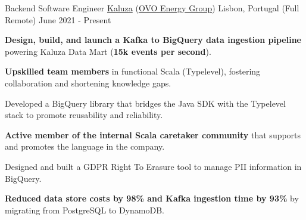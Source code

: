 
\begin{cventries}
  \vspace{-2mm}
  \cventry
    {Backend Software Engineer}
    {\href{https://www.kaluza.com/}{Kaluza} (\href{https://www.ovoenergy.com/}{OVO Energy Group})}
    {Lisbon, Portugal (Full Remote)}
    {June 2021 - Present}
    {
      \begin{cvitems}
        \item \textbf{Design, build, and launch a Kafka to BigQuery data ingestion pipeline} powering Kaluza Data Mart (\textbf{15k events per second}).
        \item \textbf{Upskilled team members} in functional Scala (Typelevel), fostering collaboration and shortening knowledge gaps.
        \item Developed a BigQuery library that bridges the Java SDK with the Typelevel stack to promote reusability and reliability. 
        \item \textbf{Active member of the internal Scala caretaker community} that supports and promotes the language in the company.
        \item Designed and built a GDPR Right To Erasure tool to manage PII information in BigQuery.
        \item \textbf{Reduced data store costs by 98\% and Kafka ingestion time by 93\%} by migrating from PostgreSQL to DynamoDB.  %
      \end{cvitems}
      \vspace{4mm}
    }



\end{cventries}
